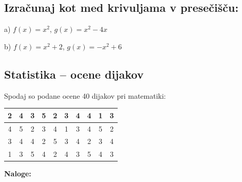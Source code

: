 \documentclass[a4paper,12pt]{article}
\begin{document}
\subsection{Izračunaj kot med krivuljama v presečišču:}

a) $f(x)=x^2$, \quad $g(x)=x^2-4x$

b) $f(x)=x^2+2$, \quad $g(x)=-x^2+6$

\vspace{1cm}

\subsection{Statistika – ocene dijakov}

Spodaj so podane ocene 40 dijakov pri matematiki:

\vspace{0.3cm}
\begin{center}
\begin{tabular}{|*{10}{c|}}
\hline
2 & 4 & 3 & 5 & 2 & 3 & 4 & 4 & 1 & 3 \\
\hline
4 & 5 & 2 & 3 & 4 & 1 & 3 & 4 & 5 & 2 \\
\hline
3 & 4 & 4 & 2 & 5 & 3 & 4 & 2 & 3 & 4 \\
\hline
1 & 3 & 5 & 4 & 2 & 4 & 3 & 5 & 4 & 3 \\
\hline
\end{tabular}
\end{center}

\vspace{0.4cm}

\textbf{Naloge:}
\end{document}
